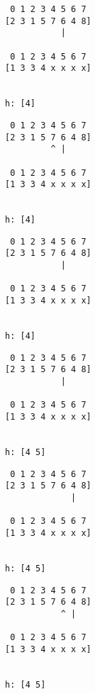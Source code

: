 { \begin{verbatim}
                    0 1 2 3 4 5 6 7
                   [2 3 1 5 7 6 4 8]
                              |

                    0 1 2 3 4 5 6 7
                   [1 3 3 4 x x x x]


                   h: [4]
\end{verbatim} }

{ \begin{verbatim}
                    0 1 2 3 4 5 6 7
                   [2 3 1 5 7 6 4 8]
                            ^ |

                    0 1 2 3 4 5 6 7
                   [1 3 3 4 x x x x]


                   h: [4]
\end{verbatim} }

{ \begin{verbatim}
                    0 1 2 3 4 5 6 7
                   [2 3 1 5 7 6 4 8]
                              |

                    0 1 2 3 4 5 6 7
                   [1 3 3 4 x x x x]


                   h: [4]
\end{verbatim} }

{ \begin{verbatim}
                    0 1 2 3 4 5 6 7
                   [2 3 1 5 7 6 4 8]
                              |

                    0 1 2 3 4 5 6 7
                   [1 3 3 4 x x x x]


                   h: [4 5]
\end{verbatim} }

{ \begin{verbatim}
                    0 1 2 3 4 5 6 7
                   [2 3 1 5 7 6 4 8]
                                |

                    0 1 2 3 4 5 6 7
                   [1 3 3 4 x x x x]


                   h: [4 5]
\end{verbatim} }

{ \begin{verbatim}
                    0 1 2 3 4 5 6 7
                   [2 3 1 5 7 6 4 8]
                              ^ |

                    0 1 2 3 4 5 6 7
                   [1 3 3 4 x x x x]


                   h: [4 5]
\end{verbatim} }

